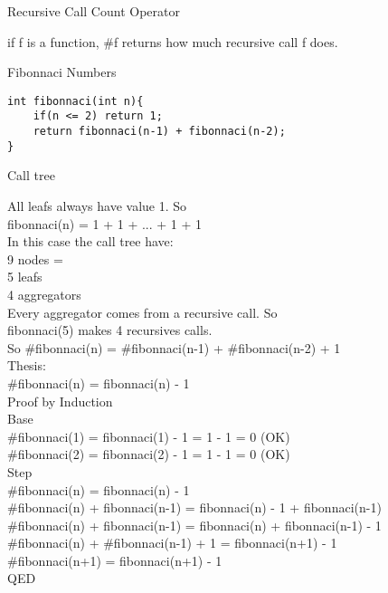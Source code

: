 \documentclass{article}
\begin{document}
	
Recursive Call Count Operator

if f is a function, \#f returns how much recursive call f does.
	
Fibonnaci Numbers

\lstset{language=C}
\begin{lstlisting}[frame=single]
int fibonnaci(int n){
	if(n <= 2) return 1;
	return fibonnaci(n-1) + fibonnaci(n-2);
}
\end{lstlisting}

Call tree\\


All leafs always have value 1. So\\ 
fibonnaci(n) = 1 + 1 + ... + 1 + 1\\
In this case the call tree have:\\
9 nodes = \\
5 leafs\\
4 aggregators\\

Every aggregator comes from a recursive call. So\\
fibonnaci(5) makes 4 recursives calls.\\

So
\#fibonnaci(n) = \#fibonnaci(n-1) + \#fibonnaci(n-2) + 1\\

Thesis:\\
\#fibonnaci(n) = fibonnaci(n) - 1\\

Proof by Induction\\
Base\\
\#fibonnaci(1) = fibonnaci(1) - 1 = 1 - 1 = 0 (OK)\\
\#fibonnaci(2) = fibonnaci(2) - 1 = 1 - 1 = 0 (OK)\\

Step\\
\#fibonnaci(n) = fibonnaci(n) - 1\\
\#fibonnaci(n) + fibonnaci(n-1) = fibonnaci(n) - 1 + fibonnaci(n-1)\\
\#fibonnaci(n) + fibonnaci(n-1) = fibonnaci(n) + fibonnaci(n-1) - 1\\
\#fibonnaci(n) + \#fibonnaci(n-1) + 1 = fibonnaci(n+1) - 1\\
\#fibonnaci(n+1) = fibonnaci(n+1) - 1\\
QED
\end{document}
